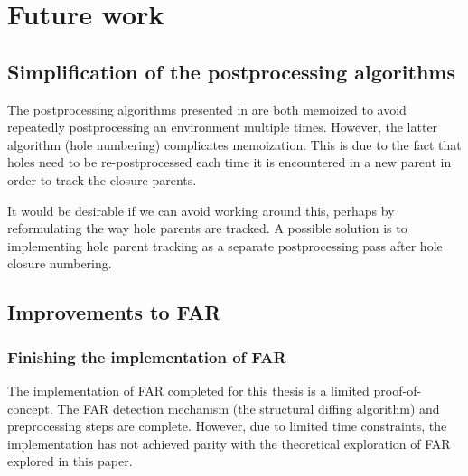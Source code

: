 \chapter{Future work}
\label{sec:future_work}

\section{Simplification of the postprocessing algorithms}
\label{sec:postprocessing-simplification}

The postprocessing algorithms presented in  are both memoized to avoid repeatedly postprocessing an environment multiple times. However, the latter algorithm (hole numbering) complicates memoization. This is due to the fact that holes need to be re-postprocessed each time it is encountered in a new parent in order to track the closure parents.

It would be desirable if we can avoid working around this, perhaps by reformulating the way hole parents are tracked. A possible solution is to implementing hole parent tracking as a separate postprocessing pass after hole closure numbering.

\section{Improvements to FAR}
\label{sec:far-improvements}

\subsection{Finishing the implementation of FAR}
\label{sec:finishing-far}

The implementation of FAR completed for this thesis is a limited proof-of-concept. The FAR detection mechanism (the structural diffing algorithm) and preprocessing steps are complete. However, due to limited time constraints, the implementation has not achieved parity with the theoretical exploration of FAR explored in this paper.

